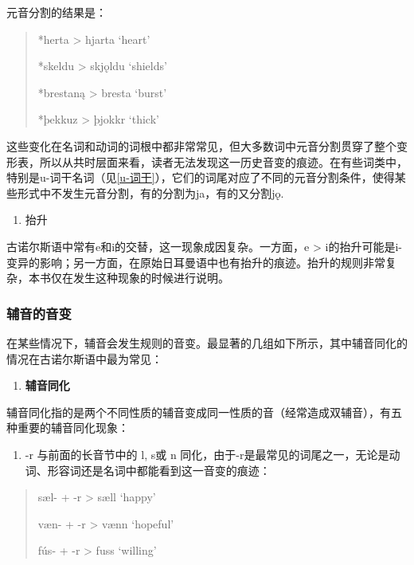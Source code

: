 元音分割的结果是：

\begin{quote}
*herta \textgreater{} hjarta `heart'

*skeldu \textgreater{} skjǫldu `shields'

*brestaną \textgreater{} bresta `burst'

*þekkuz \textgreater{} þjokkr `thick'
\end{quote}

这些变化在名词和动词的词根中都非常常见，但大多数词中元音分割贯穿了整个变形表，所以从共时层面来看，读者无法发现这一历史音变的痕迹。在有些词类中，特别是u-词干名词（见\ref{u-词干}），它们的词尾对应了不同的元音分割条件，使得某些形式中不发生元音分割，有的分割为ja，有的又分割jǫ.

\begin{enumerate}
\def\labelenumi{\Alph{enumi}.}
\setcounter{enumi}{4}
\item
  抬升
\end{enumerate}

古诺尔斯语中常有e和i的交替，这一现象成因复杂。一方面，e \textgreater{}
i的抬升可能是i-变异的影响；另一方面，在原始日耳曼语中也有抬升的痕迹。抬升的规则非常复杂，本书仅在发生这种现象的时候进行说明。

\subsubsection{辅音的音变}\label{辅音的音变}

在某些情况下，辅音会发生规则的音变。最显著的几组如下所示，其中辅音同化的情况在古诺尔斯语中最为常见：

\begin{enumerate}
\def\labelenumi{\Alph{enumi}.}
\item
  \label{_Ref117517666}{}\textbf{辅音同化}
\end{enumerate}

辅音同化指的是两个不同性质的辅音变成同一性质的音（经常造成双辅音），有五种重要的辅音同化现象：

\begin{enumerate}
\def\labelenumi{(\alph{enumi})}
\item
  \label{_Ref117517668}{}-r 与前面的长音节中的 l, s或 n
  同化，由于-r是最常见的词尾之一，无论是动词、形容词还是名词中都能看到这一音变的痕迹：
\end{enumerate}

\begin{quote}
sæl- + -r \textgreater{} sæll `happy'

væn- + -r \textgreater{} vænn `hopeful'

fús- + -r \textgreater{} fuss `willing'
\end{quote}

